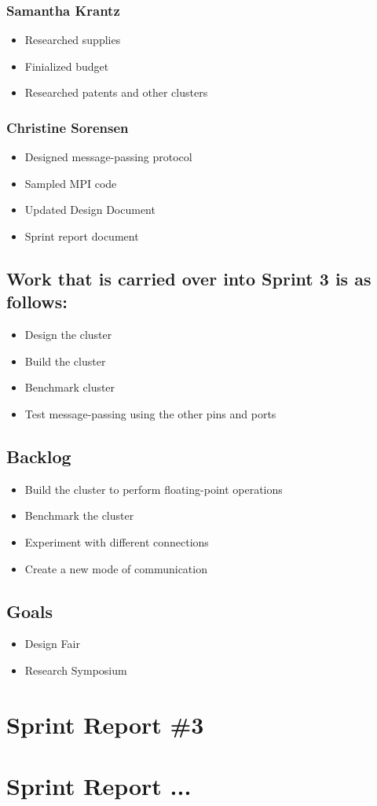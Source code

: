 \subsubsection*{Samantha Krantz}
\begin{itemize}
	\item Researched supplies
	\item Finialized budget
	\item Researched patents and other clusters
\end{itemize}

\subsubsection*{Christine Sorensen}
\begin{itemize}
	\item Designed message-passing protocol
	\item Sampled MPI code
	\item Updated Design Document
	\item Sprint report document
\end{itemize}

\subsection*{Work that is carried over into Sprint 3 is as follows:}
\begin{itemize}
	\item Design the cluster
	\item Build the cluster
	\item Benchmark cluster
	\item Test message-passing using the other pins and ports
\end{itemize}

\subsection*{Backlog}
\begin{itemize}
	\item Build the cluster to perform floating-point operations
	\item Benchmark the cluster
	\item Experiment with different connections
	\item Create a new mode of communication
\end{itemize}

\subsection*{Goals}
\begin{itemize}
	\item Design Fair
	\item Research Symposium
\end{itemize}

\section{Sprint Report \#3}

\section{Sprint Report ...}
